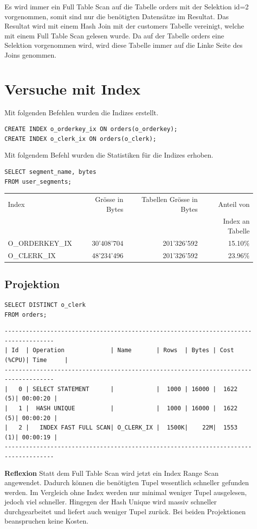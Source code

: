 \documentclass[10pt]{article}
\begin{document}
Es wird immer ein Full Table Scan auf die Tabelle orders mit der Selektion id=2 
vorgenommen, somit sind nur die benötigten Datensätze im Resultat. Das Resultat wird mit 
einem Hash Join mit der customers Tabelle vereinigt, welche mit einem Full Table Scan 
gelesen wurde. Da auf der Tabelle orders eine Selektion vorgenommen wird, wird diese 
Tabelle immer auf die Linke Seite des Joins genommen.

\newpage
\section{Versuche mit Index}
Mit folgenden Befehlen wurden die Indizes erstellt.
\begin{lstlisting}[style=sql]
CREATE INDEX o_orderkey_ix ON orders(o_orderkey);
CREATE INDEX o_clerk_ix ON orders(o_clerk);
\end{lstlisting}

Mit folgendem Befehl wurden die Statistiken für die Indizes erhoben.
\begin{lstlisting}[style=sql]
SELECT segment_name, bytes
FROM user_segments;
\end{lstlisting}

\begin{tabular}{l||r|r|r}
  Index & Grösse in Bytes & Tabellen Grösse in Bytes & Anteil von \\ 
  & & &  Index an Tabelle \\ \hline
  \hline
  O\_ORDERKEY\_IX & 30'408'704 & 201'326'592 & 15.10\%  \\ \hline
  O\_CLERK\_IX & 48'234'496 & 201'326'592 & 23.96\% \\ 
\end{tabular}

\subsection{Projektion}
\begin{lstlisting}[style=sql]
SELECT DISTINCT o_clerk
FROM orders;
\end{lstlisting}
\begin{lstlisting}[style=queryexecutionplan]
------------------------------------------------------------------------------------
| Id  | Operation             | Name       | Rows  | Bytes | Cost (%CPU)| Time     |
------------------------------------------------------------------------------------
|   0 | SELECT STATEMENT      |            |  1000 | 16000 |  1622   (5)| 00:00:20 |
|   1 |  HASH UNIQUE          |            |  1000 | 16000 |  1622   (5)| 00:00:20 |
|   2 |   INDEX FAST FULL SCAN| O_CLERK_IX |  1500K|    22M|  1553   (1)| 00:00:19 |
------------------------------------------------------------------------------------
\end{lstlisting}
\textbf{Reflexion} \newline
Statt dem Full Table Scan wird jetzt ein Index Range Scan angewendet. Dadurch können 
die benötigten Tupel wesentlich schneller gefunden werden. Im Vergleich ohne Index 
werden nur minimal weniger Tupel ausgelesen, jedoch viel schneller. Hingegen der 
Hash Unique wird massiv schneller durchgearbeitet und liefert auch weniger Tupel zurück.
Bei beiden Projektionen beanspruchen keine Kosten.
\newpage
\end{document}
